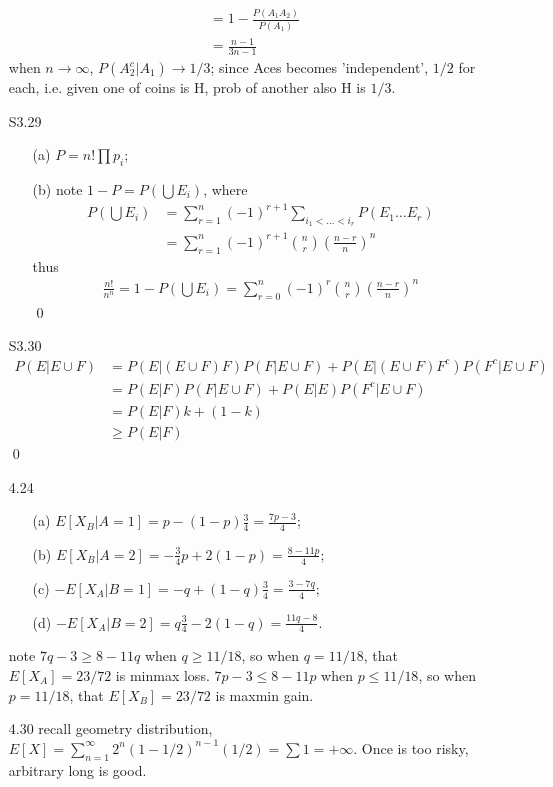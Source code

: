 \documentclass[paper=a4, fontsize=11pt]{scrartcl} %
\numberwithin{equation}{section} %
\numberwithin{figure}{section} %
\numberwithin{table}{section} %
\begin{document}
\begin{itemize}
\begin{align}
			&= 1 - \frac{P(A_1A_2)}{P(A_1)}\\
			&= \frac{n-1}{3n-1}
	\end{align}
	when $n\rightarrow\infty$, $P(A_2^c|A_1)\rightarrow 1/3$; since Aces becomes 'independent', $1/2$ for each, i.e. given one of coins is H, prob of another also H is $1/3$.
	\item[S3.29]
	\begin{itemize}
		\item[(a)] $P=n!\prod p_i$;
		\item[(b)] note $1-P = P(\bigcup E_i)$, where
		\begin{align}
			P(\bigcup E_i) &= \sum_{r=1}^n (-1)^{r+1} \sum_{i_1<\dots<i_r} P(E_1\dots E_r)\\
				&= \sum_{r=1}^n (-1)^{r+1} {n\choose r} \left(\frac{n-r}{n}\right)^n
		\end{align}
		thus 
		\begin{align}
			\frac{n!}{n^n} =  1 - P(\bigcup E_i) = \sum_{r=0}^n (-1)^{r} {n\choose r} \left(\frac{n-r}{n}\right)^n
		\end{align}\qed
	\end{itemize}
	\item[S3.30]
	\begin{align}
		P(E|E\cup F) &= P(E|(E\cup F)F) P(F|E\cup F) + P(E|(E\cup F)F^c)P(F^c|E\cup F)\\
			&= P(E|F) P(F|E\cup F) + P(E|E) P(F^c|E\cup F)\\
			&= P(E|F) k + (1-k)\\
			&\geq P(E|F)
	\end{align}\qed
	\item[4.24] 
	\begin{itemize}
		\item[(a)] $E[X_B|A=1] = p -(1-p)\frac{3}{4} =\frac{7p-3}{4}$;
		\item[(b)] $E[X_B|A=2] = -\frac{3}{4}p + 2(1-p) = \frac{8-11p}{4}$;
		\item[(c)] $-E[X_A|B=1] = -q + (1-q)\frac{3}{4} = \frac{3-7q}{4}$;
		\item[(d)] $-E[X_A|B=2] =  q\frac{3}{4} - 2(1-q) = \frac{11q-8}{4}$.
	\end{itemize}
	note $7q-3\geq 8-11q$ when $q\geq 11/18$, so when $q=11/18$, that $E[X_A] = 23/72$ is minmax loss. $7p-3\leq 8-11p$ when $p\leq 11/18$, so when $p=11/18$, that $E[X_B] = 23/72$ is maxmin gain.
	\item[4.30] recall geometry distribution, $E[X] = \sum_{n=1}^\infty 2^n(1-1/2)^{n-1}(1/2) =\sum 1 = +\infty$. Once is too risky, arbitrary long is good.

\end{itemize}
\end{document}

